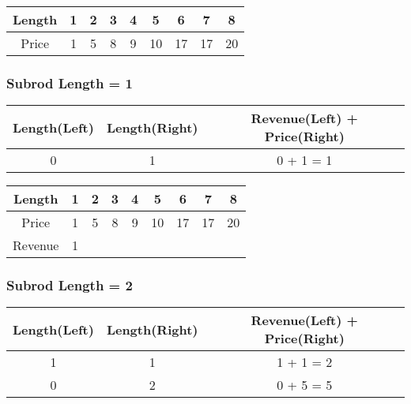 \begin{table}[H]
	\centering
	\begin{tabular}{| c | c | c | c | c | c | c | c | c |}
		\hline
		Length
			&	1
			&	2
			&	3
			&	4
			&	5
			&	6
			&	7
			&	8\\
		\hline
		Price
			&	1
			&	5
			&	8
			&	9
			&	10
			&	17
			&	17
			&	20\\
		\hline
	\end{tabular}
\end{table}

\subsubsection*{Subrod Length = 1}

\begin{table}[h]
	\centering
	\begin{tabular}{| c | c | c |}
		\hline
		Length(Left)	&	Length(Right)	&	Revenue(Left) + Price(Right)\\
		\hline
		0
			&	1
			&	0 + 1 = 1\\
		\hline
	\end{tabular}	
\end{table}

\begin{table}[H]
	\centering
	\begin{tabular}{| c | c | c | c | c | c | c | c | c |}
		\hline
		Length
		&	1
		&	2
		&	3
		&	4
		&	5
		&	6
		&	7
		&	8\\
		\hline
		Price
		&	1
		&	5
		&	8
		&	9
		&	10
		&	17
		&	17
		&	20\\
		\hline
		Revenue
		&	1
		&	
		&	
		&
		&	
		&	
		&	
		&	\\
		\hline
	\end{tabular}
\end{table}

\subsubsection*{Subrod Length = 2}

\begin{table}[h]
	\centering
	\begin{tabular}{| c | c | c |}
		\hline
		Length(Left)	&	Length(Right)	&	Revenue(Left) + Price(Right)\\
		\hline
		1
			&	1
			&	1 + 1 = 2\\
		\hline
		0	
			&	2
			&	0 + 5 = 5\\
		\hline
	\end{tabular}	
\end{table}


